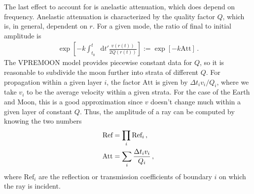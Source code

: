 \documentclass[prd,reprint,10pt,tightenlines]{revtex4-1}
\newcommand*\diff{\mathop{}\!\mathrm{d}}
\newcommand*\te[1]{\text{#1}}
\newcommand*\ps[1]{\left[#1\right]}
\newcommand*\f[2]{\frac{#1}{#2}}
\begin{document}
The last effect to account for is anelastic attenuation, which does depend on frequency. Anelastic attenuation is characterized by the quality factor $Q$, which is, in general, dependent on $r$. For a given mode, the ratio of final to initial amplitude is
\begin{align}
\exp\ps{-k \int_{t_0}^t\diff t'\f{v(r(t))}{2Q(r(t))}}:=\exp\ps{-k \te{Att}}\,.
\end{align}
The VPREMOON model provides piecewise constant data for $Q$, so it is reasonable to subdivide the moon further into strata of different $Q$. For propagation within a given layer $i$, the factor $\te{Att}$ is given by $\Delta t_i v_i/Q_i$, where we take $v_i$ to be the average velocity within a given strata. For the case of the Earth and Moon, this is a good approximation since $v$ doesn't change much within a given layer of constant $Q$. Thus, the amplitude of a ray can be computed by knowing the two numbers
\begin{align}
\te{Ref} \notag&= \prod_i\te{Ref}_i\,,\\
\te{Att} &=\sum_i\f{\Delta t_i v_i}{Q_i}\,,
\end{align}
where $\te{Ref}_i$ are the reflection or transmission coefficients of boundary $i$ on which the ray is incident.
\end{document}
